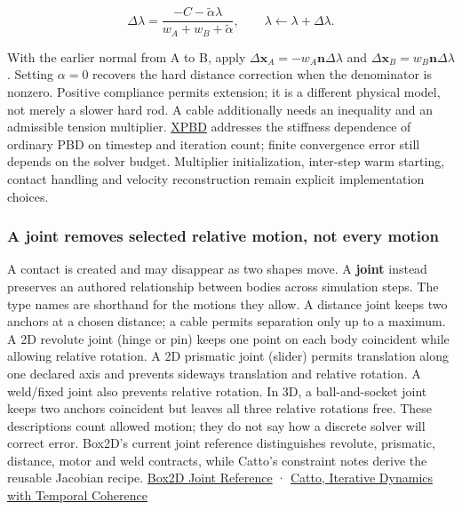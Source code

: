 \[
\Delta\lambda=\frac{-C-\widetilde\alpha\lambda}{w_A+w_B+\widetilde\alpha},\qquad
\lambda\leftarrow\lambda+\Delta\lambda.
\]

With the earlier normal from A to B, apply \(\Delta\mathbf x_A=-w_A\mathbf n\Delta\lambda\) and \(\Delta\mathbf x_B=w_B\mathbf n\Delta\lambda\). Setting \(\alpha=0\) recovers the hard distance correction when the denominator is nonzero. Positive compliance permits extension; it is a different physical model, not merely a slower hard rod. A cable additionally needs an inequality and an admissible tension multiplier. \href{https://mmacklin.com/xpbd.pdf}{XPBD} addresses the stiffness dependence of ordinary PBD on timestep and iteration count; finite convergence error still depends on the solver budget. Multiplier initialization, inter-step warm starting, contact handling and velocity reconstruction remain explicit implementation choices.

\subsubsection{A joint removes selected relative motion, not every motion}\label{06-engine-ii-ch033-a-joint-removes-selected-relative-motion-not-every-motion}

\hypertarget{06-engine-ii-ch033-a-joint-removes-selected-relative-motion-not-every-motion}{}

A contact is created and may disappear as two shapes move. A \textbf{joint} instead preserves an authored relationship between bodies across simulation steps. The type names are shorthand for the motions they allow. A distance joint keeps two anchors at a chosen distance; a cable permits separation only up to a maximum. A 2D revolute joint (hinge or pin) keeps one point on each body coincident while allowing relative rotation. A 2D prismatic joint (slider) permits translation along one declared axis and prevents sideways translation and relative rotation. A weld/fixed joint also prevents relative rotation. In 3D, a ball-and-socket joint keeps two anchors coincident but leaves all three relative rotations free. These descriptions count allowed motion; they do not say how a discrete solver will correct error. Box2D's current joint reference distinguishes revolute, prismatic, distance, motor and weld contracts, while Catto's constraint notes derive the reusable Jacobian recipe. \href{https://box2d.org/documentation/group__joint.html}{Box2D Joint Reference} · \href{https://box2d.org/files/ErinCatto_IterativeDynamicsSlides_GDC2005.pdf}{Catto, Iterative Dynamics with Temporal Coherence}

